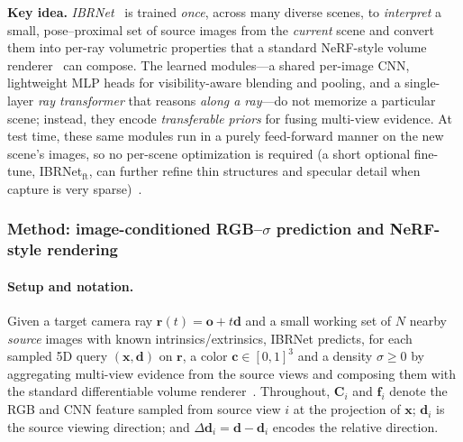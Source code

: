 \begin{enrichment}
\begin{enrichment}
     \textbf{Key idea.} \emph{IBRNet}~\cite{wang2021_ibrnet} is trained \emph{once}, across many diverse scenes, to \emph{interpret} a small, pose–proximal set of source images from the \emph{current} scene and convert them into per-ray volumetric properties that a standard NeRF-style volume renderer~\cite{mildenhall2020_nerf} can compose. The learned modules—a shared per-image CNN, lightweight MLP heads for visibility-aware blending and pooling, and a single-layer \emph{ray transformer} that reasons \emph{along a ray}—do not memorize a particular scene; instead, they encode \emph{transferable priors} for fusing multi-view evidence. At test time, these same modules run in a purely feed-forward manner on the new scene’s images, so no per-scene optimization is required (a short optional fine-tune, IBRNet\(_\text{ft}\), can further refine thin structures and specular detail when capture is very sparse)~\cite{wang2021_ibrnet}.
     
     \subsubsection{Method: image-conditioned RGB--\texorpdfstring{$\sigma$}{sigma} prediction and NeRF-style rendering}
     \label{subsec:chapter23_ibrnet_method}
     
     \paragraph{Setup and notation.}
     Given a target camera ray $\mathbf{r}(t)=\mathbf{o}+t\mathbf{d}$ and a small working set of $N$ nearby \emph{source} images with known intrinsics/extrinsics, IBRNet predicts, for each sampled 5D query $(\mathbf{x},\mathbf{d})$ on $\mathbf{r}$, a color $\mathbf{c}\in[0,1]^3$ and a density $\sigma\ge 0$ by aggregating multi-view evidence from the source views and composing them with the standard differentiable volume renderer~\cite{mildenhall2020_nerf,wang2021_ibrnet}. Throughout, $\mathbf{C}_i$ and $\mathbf{f}_i$ denote the RGB and CNN feature sampled from source view $i$ at the projection of $\mathbf{x}$; $\mathbf{d}_i$ is the source viewing direction; and $\Delta\mathbf{d}_i=\mathbf{d}-\mathbf{d}_i$ encodes the relative direction.
     

\end{enrichment}
\end{enrichment}
